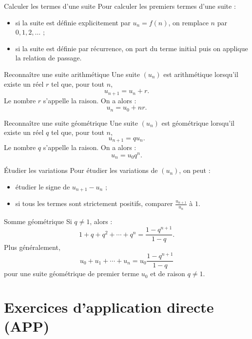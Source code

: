 \documentclass[11pt,a4paper]{article}
\begin{document}
\begin{methodbox}{Calculer les termes d'une suite}
Pour calculer les premiers termes d'une suite :
\begin{itemize}
  \item si la suite est définie explicitement par \(u_n=f(n)\), on remplace \(n\) par \(0,1,2,\ldots\) ;
  \item si la suite est définie par récurrence, on part du terme initial puis on applique la relation de passage.
\end{itemize}
\end{methodbox}

\begin{methodbox}{Reconnaître une suite arithmétique}
Une suite \((u_n)\) est arithmétique lorsqu'il existe un réel \(r\) tel que, pour tout \(n\),
\[
u_{n+1}=u_n+r.
\]
Le nombre \(r\) s'appelle la raison. On a alors :
\[
u_n=u_0+nr.
\]
\end{methodbox}

\begin{methodbox}{Reconnaître une suite géométrique}
Une suite \((u_n)\) est géométrique lorsqu'il existe un réel \(q\) tel que, pour tout \(n\),
\[
u_{n+1}=q u_n.
\]
Le nombre \(q\) s'appelle la raison. On a alors :
\[
u_n=u_0 q^n.
\]
\end{methodbox}

\begin{methodbox}{Étudier les variations}
Pour étudier les variations de \((u_n)\), on peut :
\begin{itemize}
  \item étudier le signe de \(u_{n+1}-u_n\) ;
  \item si tous les termes sont strictement positifs, comparer \(\frac{u_{n+1}}{u_n}\) à \(1\).
\end{itemize}
\end{methodbox}

\begin{rememberbox}{Somme géométrique}
Si \(q\neq 1\), alors :
\[
1+q+q^2+\cdots+q^n=\frac{1-q^{n+1}}{1-q}.
\]
Plus généralement,
\[
u_0+u_1+\cdots+u_n=u_0\frac{1-q^{n+1}}{1-q}
\]
pour une suite géométrique de premier terme \(u_0\) et de raison \(q\neq 1\).
\end{rememberbox}

\newpage

\section{Exercices d'application directe (APP)}
\end{document}
